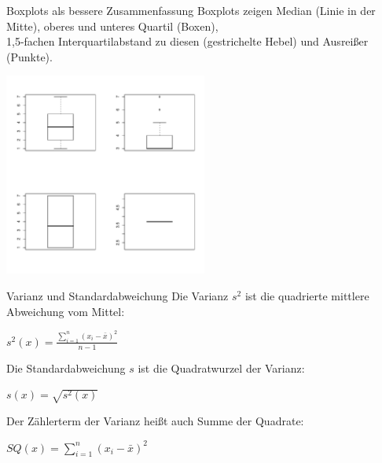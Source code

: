 \begin{frame}
  {Boxplots als bessere Zusammenfassung}
  Boxplots zeigen Median (Linie in der Mitte), oberes und unteres Quartil (Boxen),\\
  1,5-fachen Interquartilabstand zu diesen (gestrichelte Hebel) und Ausreißer (Punkte).
  \vspace{-0.5cm}
  \begin{center}
    \includegraphics[width=0.5\textwidth]{graphics/fourbox}
  \end{center}
\end{frame}


\begin{frame}
  {Varianz und Standardabweichung}
    Die \alert{Varianz $s^2$} ist die quadrierte mittlere Abweichung vom Mittel:\\
      \begin{center}
	\alert{$s^2(x)=\frac{ \sum\limits_{i=1}^{n}(x_i-\bar{x})^2}{n-1}$}
      \end{center}
\pause
      \vspace{0.5cm}
    Die \alert{Standardabweichung $s$} ist die Quadratwurzel der Varianz:\\
      \begin{center}
	\alert{$s(x)=\sqrt{s^2(x)}$}
      \end{center}
      \vspace{0.5cm}

  \pause
    Der Zählerterm der Varianz heißt auch \alert{Summe der Quadrate}:\\
  \begin{center}
    $SQ(x)=\sum\limits_{i=1}^{n}(x_i-\bar{x})^2$
  \end{center}
\end{frame}

